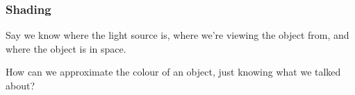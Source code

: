 \documentclass[12pt]{beamer}
\begin{document}

  \begin{frame}
    \frametitle{Shading}

    Say we know where the light source is, where we're viewing the object from, and where the object is in space.

    \hfill


    How can we approximate the colour of an object, just knowing what we talked about?

  \end{frame}
\end{document}
